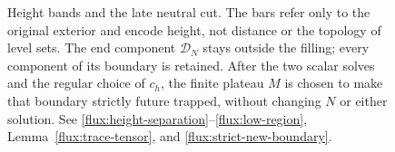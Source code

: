 \begin{figure}[tbp]
\caption{Height bands and the late neutral cut. The bars refer only to the
original exterior and encode height, not distance or the topology of level
sets. The end component $\mathcal D_N$ stays outside the filling; every
component of its boundary is retained. After the two scalar solves and the
regular choice of $c_h$, the finite plateau $M$ is chosen to make that
boundary strictly future trapped, without changing $N$ or either solution.
See \eqref{flux:height-separation}--\eqref{flux:low-region},
Lemma~\ref{flux:trace-tensor}, and \eqref{flux:strict-new-boundary}.}
\label{flux:fig-height-bands}
\end{figure}
